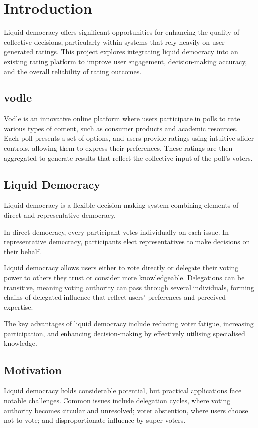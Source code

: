 \chapter{Introduction}
\label{ch:introduction}

Liquid democracy offers significant opportunities for enhancing the quality of collective decisions, particularly within systems that rely heavily on user-generated ratings. This project explores integrating liquid democracy into an existing rating platform to improve user engagement, decision-making accuracy, and the overall reliability of rating outcomes.

\section{vodle} Vodle is an innovative online platform where users participate in polls to rate various types of content, such as consumer products and academic resources. Each poll presents a set of options, and users provide ratings using intuitive slider controls, allowing them to express their preferences. These ratings are then aggregated to generate results that reflect the collective input of the poll's voters.

\section{Liquid Democracy}
Liquid democracy is a flexible decision-making system combining elements of direct and representative democracy.

In direct democracy, every participant votes individually on each issue. In representative democracy, participants elect representatives to make decisions on their behalf.

Liquid democracy allows users either to vote directly or delegate their voting power to others they trust or consider more knowledgeable. Delegations can be transitive, meaning voting authority can pass through several individuals, forming chains of delegated influence that reflect users' preferences and perceived expertise.

The key advantages of liquid democracy include reducing voter fatigue, increasing participation, and enhancing decision-making by effectively utilising specialised knowledge.

\section{Motivation}
Liquid democracy holds considerable potential, but practical applications face notable challenges. Common issues include delegation cycles, where voting authority becomes circular and unresolved; voter abstention, where users choose not to vote; and disproportionate influence by super-voters.

